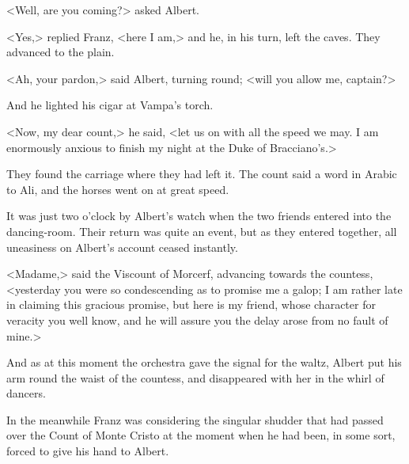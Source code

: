  <Well, are you coming?> asked Albert. 

 <Yes,> replied Franz, <here I am,> and he, in his turn, left the caves. They advanced to the plain. 

 <Ah, your pardon,> said Albert, turning round; <will you allow me, captain?> 

 And he lighted his cigar at Vampa's torch. 

 <Now, my dear count,> he said, <let us on with all the speed we may. I am enormously anxious to finish my night at the Duke of Bracciano's.> 

 They found the carriage where they had left it. The count said a word in Arabic to Ali, and the horses went on at great speed. 

 It was just two o'clock by Albert's watch when the two friends entered into the dancing-room. Their return was quite an event, but as they entered together, all uneasiness on Albert's account ceased instantly. 

 <Madame,> said the Viscount of Morcerf, advancing towards the countess, <yesterday you were so condescending as to promise me a galop; I am rather late in claiming this gracious promise, but here is my friend, whose character for veracity you well know, and he will assure you the delay arose from no fault of mine.> 

 And as at this moment the orchestra gave the signal for the waltz, Albert put his arm round the waist of the countess, and disappeared with her in the whirl of dancers. 

 In the meanwhile Franz was considering the singular shudder that had passed over the Count of Monte Cristo at the moment when he had been, in some sort, forced to give his hand to Albert. 